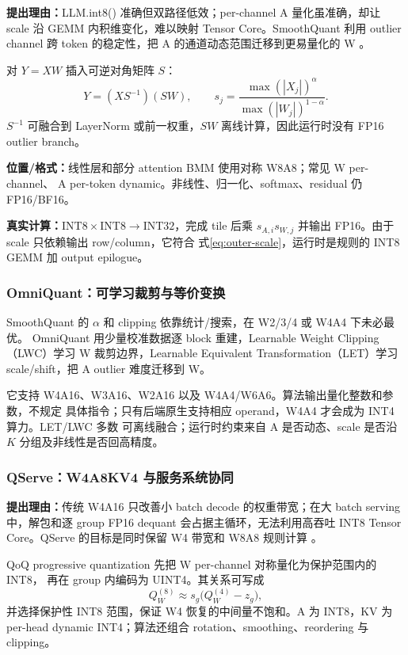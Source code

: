 \textbf{提出理由：}LLM.int8() 准确但双路径低效；per-channel A 量化虽准确，却让
scale 沿 GEMM 内积维变化，难以映射 Tensor Core。SmoothQuant 利用 outlier channel
跨 token 的稳定性，把 A 的通道动态范围迁移到更易量化的 W
。

对 $Y=XW$ 插入可逆对角矩阵 $S$：
\begin{equation}
  Y=(XS^{-1})(SW),\qquad
  s_j=\frac{\max(|X_j|)^{\alpha}}
  {\max(|W_j|)^{1-\alpha}}.
  \label{eq:smoothquant}
\end{equation}
$S^{-1}$ 可融合到 LayerNorm 或前一权重，$SW$ 离线计算，因此运行时没有 FP16
outlier branch。

\textbf{位置/格式：}线性层和部分 attention BMM 使用对称 W8A8；常见 W per-channel、
A per-token dynamic。非线性、归一化、softmax、residual 仍 FP16/BF16。

\textbf{真实计算：}$\mathrm{INT8}\times\mathrm{INT8}\rightarrow\mathrm{INT32}$，完成 tile 后乘
$s_{A,i}s_{W,j}$ 并输出 FP16。由于 scale 只依赖输出 row/column，它符合
式\eqref{eq:outer-scale}，运行时是规则的 INT8 GEMM 加 output epilogue。

\subsubsection{OmniQuant：可学习裁剪与等价变换}

SmoothQuant 的 $\alpha$ 和 clipping 依靠统计/搜索，在 W2/3/4 或 W4A4 下未必最优。
OmniQuant 用少量校准数据逐 block 重建，Learnable Weight Clipping（LWC）学习 W
裁剪边界，Learnable Equivalent Transformation（LET）学习 scale/shift，把 A
outlier 难度迁移到 W。

它支持 W4A16、W3A16、W2A16 以及 W4A4/W6A6。算法输出量化整数和参数，不规定
具体指令；只有后端原生支持相应 operand，W4A4 才会成为 INT4 算力。LET/LWC 多数
可离线融合；运行时约束来自 A 是否动态、scale 是否沿 $K$ 分组及非线性是否回高精度。

\subsubsection{QServe：W4A8KV4 与服务系统协同}

\textbf{提出理由：}传统 W4A16 只改善小 batch decode 的权重带宽；在大 batch
serving 中，解包和逐 group FP16 dequant 会占据主循环，无法利用高吞吐 INT8 Tensor
Core。QServe 的目标是同时保留 W4 带宽和 W8A8 规则计算
。

QoQ progressive quantization 先把 W per-channel 对称量化为保护范围内的 INT8，
再在 group 内编码为 UINT4。其关系可写成
\begin{equation}
  Q_W^{(8)}\approx s_g\bigl(Q_W^{(4)}-z_g\bigr),
  \label{eq:qserve-progressive}
\end{equation}
并选择保护性 INT8 范围，保证 W4 恢复的中间量不饱和。A 为 INT8，KV 为 per-head
dynamic INT4；算法还组合 rotation、smoothing、reordering 与 clipping。

